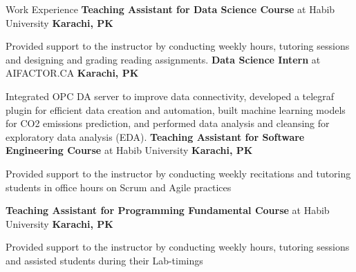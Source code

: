\begin{rubric}{Work Experience}
%
        \textbf{Teaching Assistant for Data Science Course} at Habib University \hfill\textbf{Karachi, PK}
        \par Provided support to the instructor by conducting weekly hours, tutoring sessions and designing and grading reading assignments.
%
	\textbf{Data Science Intern} at AIFACTOR.CA \hfill\textbf{Karachi, PK}
        \par Integrated OPC DA server to improve data connectivity, developed a telegraf plugin for efficient data creation and automation, built machine learning models for CO2 emissions prediction, and performed data analysis and cleansing for exploratory data analysis (EDA).
%
        \textbf{Teaching Assistant for Software Engineering Course} at Habib University \hfill\textbf{Karachi, PK}
        \par Provided support to the instructor by conducting weekly recitations and tutoring students in office hours on Scrum and Agile practices



%
        \textbf{Teaching Assistant for Programming Fundamental Course} at Habib University \hfill\textbf{Karachi, PK}
        \par Provided support to the instructor by conducting weekly hours, tutoring sessions and assisted students during their Lab-timings
        
        
\end{rubric}